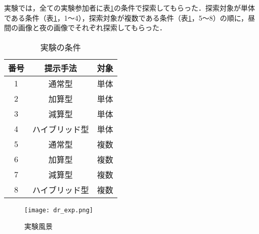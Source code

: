   実験では，全ての実験参加者に表\ref{table:exp_dr_order}の条件で探索してもらった．探索対象が単体である条件（表\ref{table:exp_dr_order}，1〜4），探索対象が複数である条件（表\ref{table:exp_dr_order}，5〜8）の順に，昼間の画像と夜の画像でそれぞれ探索してもらった．

  \begin{table}[tb]
    \caption{実験の条件}
    \label{table:exp_dr_order}
    \begin{center}
    \begin{tabular}{ccc}
      \hline\hline
      \textbf{番号} & \multicolumn{1}{c}{\textbf{提示手法}} & \textbf{対象} \\
      \hline
      1 & 通常型 & 単体 \\
      2 & 加算型 & 単体 \\
      3 & 減算型 & 単体 \\
      4 & ハイブリッド型 & 単体 \\
      \hline
      5 & 通常型 & 複数 \\
      6 & 加算型 & 複数 \\
      7 & 減算型 & 複数 \\
      8 & ハイブリッド型 & 複数 \\
      \hline
    \end{tabular}
  \end{center}
  \end{table}

  \begin{figure}[tb]
    \centerline{\texttt{[image: dr\_exp.png]}}
    \caption{実験風景}
    \label{figure:exp_dr_scenery}
  \end{figure}

